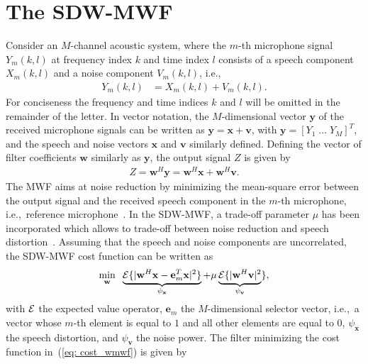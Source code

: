 \documentclass[10pt]{IEEEtran}
\begin{document}
\section{The SDW-MWF}
\label{sec:mwf}
Consider an $M$-channel acoustic system, where the $m$-th microphone signal $Y_m(k,l)$ at frequency index $k$ and time index $l$ consists of a speech component $X_m(k,l)$ and a noise component $V_m(k,l)$, i.e.,
\begin{align}
Y_m(k,l) &= X_m(k,l) + V_m(k,l).
\end{align}
For conciseness the frequency and time indices $k$ and $l$ will be omitted in the remainder of the letter.
In vector notation, the $M$-dimensional vector $\mathbf{y}$ of the received microphone signals can be written as $\mathbf{y} = \mathbf{x} + \mathbf{v}$,
with $\mathbf{y} = [Y_1 \; \ldots \; Y_M]^T$, and the speech and noise vectors $\mathbf{x}$ and $\mathbf{v}$ similarly defined.
Defining the vector of filter coefficients $\mathbf{w}$ similarly as $\mathbf{y}$, the output signal $Z$ is given by
\begin{align}
  Z = \mathbf{w}^H \mathbf{y} = \mathbf{w}^H \mathbf{x} + \mathbf{w}^H \mathbf{v}.
\end{align}
The MWF aims at noise reduction by minimizing the mean-square error between the output signal and the received speech component in the $m$-th microphone, i.e.,~reference microphone~\cite{Doclo_Chap_2010}.
In the SDW-MWF, a trade-off parameter $\mu$ has been incorporated which allows to trade-off between noise reduction and speech distortion~\cite{Spriet_SP_2004,Doclo_SC_2007}.
Assuming that the speech and noise components are uncorrelated, the SDW-MWF cost function can be written as
\begin{align}
  \label{eq: cost_wmwf}
    \min_{\mathbf{w}} \; \; \underbrace{{\cal{E}} \{ |\mathbf{w}^H \mathbf{x}- \mathbf{e}_m^T \mathbf{x}|^2 \}}_{\psi_{\mathbf{x}}} +  \mu \underbrace{{\cal{E}} \{ |\mathbf{w}^H \mathbf{v}|^2}_{\psi_{\mathbf{v}}} \}, 
\end{align}
with ${\cal{E}}$ the expected value operator, $\mathbf{e}_m$ the $M$-dimensional selector vector, i.e.,~a vector whose $m$-th element is equal to $1$ and all other elements are equal to $0$, $\psi_{\mathbf{x}}$ the speech distortion, and $\psi_{\mathbf{v}}$ the noise power.
The filter minimizing the cost function in~(\ref{eq: cost_wmwf}) is given by
\end{document}
